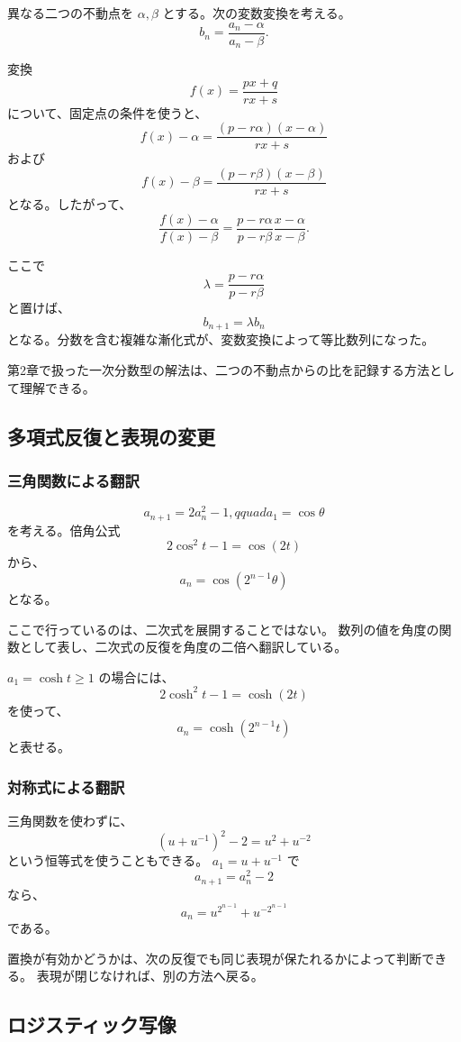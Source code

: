 異なる二つの不動点を $\alpha,\beta$ とする。次の変数変換を考える。
\[
  b_n=\frac{a_n-\alpha}{a_n-\beta}.
\]

変換
\[
  f(x)=\frac{px+q}{rx+s}
\]
について、固定点の条件を使うと、
\[
  f(x)-\alpha
  =\frac{(p-r\alpha)(x-\alpha)}{rx+s}
\]
および
\[
  f(x)-\beta
  =\frac{(p-r\beta)(x-\beta)}{rx+s}
\]
となる。したがって、
\[
  \frac{f(x)-\alpha}{f(x)-\beta}
  =\frac{p-r\alpha}{p-r\beta}
   \frac{x-\alpha}{x-\beta}.
\]

ここで
\[
  \lambda=\frac{p-r\alpha}{p-r\beta}
\]
と置けば、
\[
  b_{n+1}=\lambda b_n
\]
となる。分数を含む複雑な漸化式が、変数変換によって等比数列になった。

第2章で扱った一次分数型の解法は、二つの不動点からの比を記録する方法として理解できる。

\subsection{多項式反復と表現の変更}

\subsubsection{三角関数による翻訳}

\[
  a_{n+1}=2a_n^2-1,qquad a_1=\cos\theta
\]
を考える。倍角公式
\[
  2\cos^2t-1=\cos(2t)
\]
から、
\[
  a_n=\cos(2^{n-1}\theta)
\]
となる。

ここで行っているのは、二次式を展開することではない。
数列の値を角度の関数として表し、二次式の反復を角度の二倍へ翻訳している。

$a_1=\cosh t\geq1$ の場合には、
\[
  2\cosh^2t-1=\cosh(2t)
\]
を使って、
\[
  a_n=\cosh(2^{n-1}t)
\]
と表せる。

\subsubsection{対称式による翻訳}

三角関数を使わずに、
\[
  (u+u^{-1})^2-2=u^2+u^{-2}
\]
という恒等式を使うこともできる。
$a_1=u+u^{-1}$ で
\[
  a_{n+1}=a_n^2-2
\]
なら、
\[
  a_n=u^{2^{n-1}}+u^{-2^{n-1}}
\]
である。

置換が有効かどうかは、次の反復でも同じ表現が保たれるかによって判断できる。
表現が閉じなければ、別の方法へ戻る。

\subsection{ロジスティック写像}

